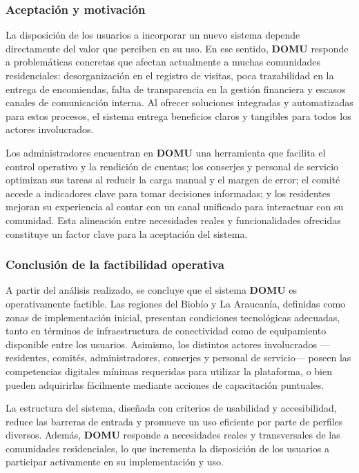 \subsubsection{Aceptación y motivación}

La disposición de los usuarios a incorporar un nuevo sistema depende directamente del valor que perciben en su uso. En ese sentido, \textbf{DOMU} responde a problemáticas concretas que afectan actualmente a muchas comunidades residenciales: desorganización en el registro de visitas, poca trazabilidad en la entrega de encomiendas, falta de transparencia en la gestión financiera y escasos canales de comunicación interna. Al ofrecer soluciones integradas y automatizadas para estos procesos, el sistema entrega beneficios claros y tangibles para todos los actores involucrados.

Los administradores encuentran en \textbf{DOMU} una herramienta que facilita el control operativo y la rendición de cuentas; los conserjes y personal de servicio optimizan sus tareas al reducir la carga manual y el margen de error; el comité accede a indicadores clave para tomar decisiones informadas; y los residentes mejoran su experiencia al contar con un canal unificado para interactuar con su comunidad. Esta alineación entre necesidades reales y funcionalidades ofrecidas constituye un factor clave para la aceptación del sistema.

\subsubsection*{Conclusión de la factibilidad operativa}

A partir del análisis realizado, se concluye que el sistema \textbf{DOMU} es operativamente factible. Las regiones del Biobío y La Araucanía, definidas como zonas de implementación inicial, presentan condiciones tecnológicas adecuadas, tanto en términos de infraestructura de conectividad como de equipamiento disponible entre los usuarios. Asimismo, los distintos actores involucrados —residentes, comités, administradores, conserjes y personal de servicio— poseen las competencias digitales mínimas requeridas para utilizar la plataforma, o bien pueden adquirirlas fácilmente mediante acciones de capacitación puntuales.

La estructura del sistema, diseñada con criterios de usabilidad y accesibilidad, reduce las barreras de entrada y promueve un uso eficiente por parte de perfiles diversos. Además, \textbf{DOMU} responde a necesidades reales y transversales de las comunidades residenciales, lo que incrementa la disposición de los usuarios a participar activamente en su implementación y uso.


